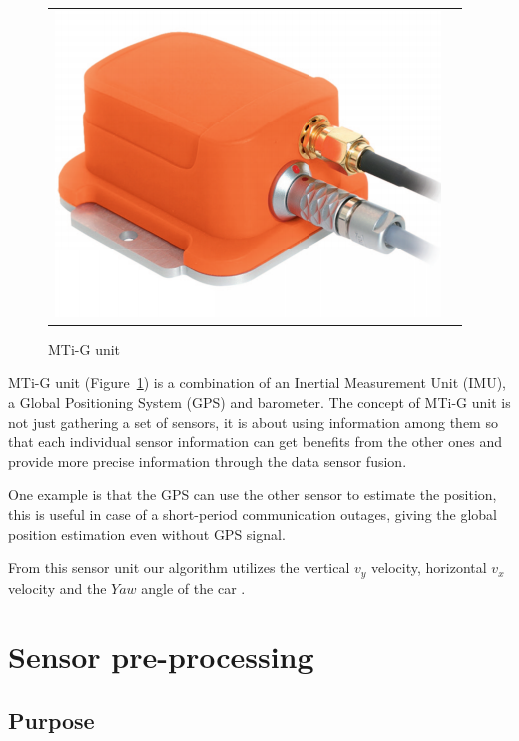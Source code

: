 \begin{figure}[H]
   \centering
     \begin{tabular}{lr}
       \includegraphics[scale=0.3]{img/mti-g}
     \end{tabular}
   \caption{MTi-G unit}
   \label{fig:xsens:mtig}
 \end{figure}

MTi-G unit (Figure~\ref{fig:xsens:mtig}) is a combination of an Inertial Measurement Unit (IMU), a Global Positioning System (GPS) and barometer. The concept of MTi-G unit is not just gathering a set of sensors, it is about using information among them so that each individual sensor information can get benefits from the other ones and provide more precise information through the data sensor fusion.

One example is that the GPS can use the other sensor to estimate the position, this is useful in case of a short-period communication outages, giving the global position estimation even without GPS signal. 

From this sensor unit our algorithm utilizes the vertical $v_y$ velocity, horizontal $v_x$ velocity and the $Yaw$ angle of the car \cite{etkin2005dynamics}. 

\section{Sensor pre-processing} %
\label{sec:sensor:fusion}


\subsection{Purpose}

